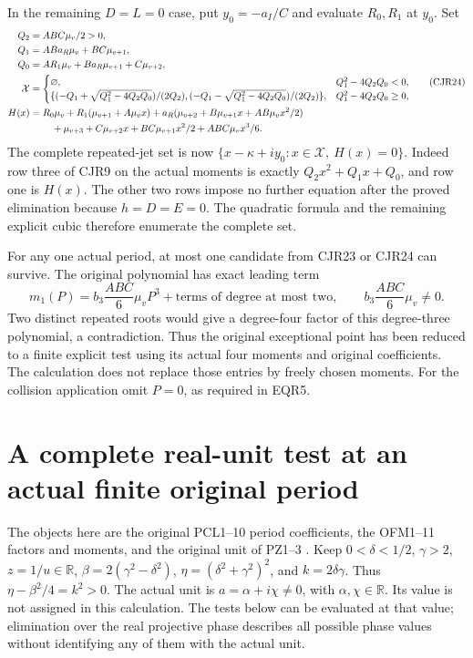 \documentclass[11pt]{article}
\begin{document}
In the remaining $D=L=0$ case, put $y_0=-a_I/C$ and evaluate
$R_0,R_1$ at $y_0$. Set
\[
\begin{split}
 Q_2&=ABC\mu_v/2>0,\\
 Q_1&=ABa_R\mu_v+BC\mu_{v+1},\\
 Q_0&=AR_1\mu_v+Ba_R\mu_{v+1}+C\mu_{v+2},\\
 \mathcal X&=\begin{cases}
 \varnothing,&Q_1^2-4Q_2Q_0<0,\\
 \{(-Q_1+\sqrt{Q_1^2-4Q_2Q_0})/(2Q_2),
   (-Q_1-\sqrt{Q_1^2-4Q_2Q_0})/(2Q_2)\},&Q_1^2-4Q_2Q_0\ge0,
 \end{cases}\\
 H(x)&=R_0\mu_v+R_1(\mu_{v+1}+A\mu_vx)
       +a_R(\mu_{v+2}+B\mu_{v+1}x+AB\mu_vx^2/2)\\
 &\hspace{8mm}+\mu_{v+3}+C\mu_{v+2}x+
                 BC\mu_{v+1}x^2/2+ABC\mu_vx^3/6.
\end{split}\tag{CJR24}
\]
The complete repeated-jet set is now
$\{x-\kappa+iy_0:x\in\mathcal X,\ H(x)=0\}$.
Indeed row three of CJR9 on the actual moments is exactly
$Q_2x^2+Q_1x+Q_0$, and row one is $H(x)$.
The other two rows impose no further equation after the proved
elimination because $h=D=E=0$. The quadratic formula and the
remaining explicit cubic therefore enumerate the complete set.

For any one actual period, at most one candidate from CJR23 or
CJR24 can survive. The original polynomial has exact leading term
\[
 m_1(P)=b_3\frac{ABC}{6}\mu_vP^3+
                         \text{terms of degree at most two},
 \qquad b_3\frac{ABC}{6}\mu_v\ne0.
 \tag{CJR25}
\]
Two distinct repeated roots would give a degree-four factor of
this degree-three polynomial, a contradiction. Thus the original
exceptional point has been reduced to a finite explicit test using
its actual four moments and original coefficients. The calculation
does not replace those entries by freely chosen moments. For the
collision application omit $P=0$, as required in EQR5.



\section{A complete real-unit test at an actual finite original period}
The objects here are the original PCL1--10 period coefficients,
the OFM1--11 factors and moments, and the original unit of PZ1--3
\cite{PCLOriginal,NC,Cumulative,PeriodZeroOriginal}.
Keep $0<\delta<1/2$, $\gamma>2$, $z=1/u\in\mathbb R$,
$\beta=2(\gamma^2-\delta^2)$, $\eta=(\delta^2+\gamma^2)^2$,
and $k=2\delta\gamma$. Thus
$\eta-\beta^2/4=k^2>0$. The actual unit is
$a=\alpha+i\chi\ne0$, with $\alpha,\chi\in\mathbb R$.
Its value is not assigned in this calculation. The tests below can be
evaluated at that value; elimination over the real projective phase
describes all possible phase values without identifying any of them
with the actual unit.
\end{document}
